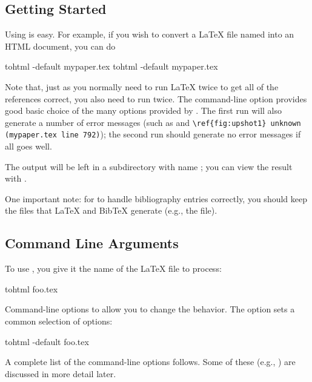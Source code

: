 \subsection{Getting Started}
Using  is easy.  For example, if you wish to convert a LaTeX file
named  into an HTML document, you can do
\begin{example}
tohtml -default mypaper.tex
tohtml -default mypaper.tex
\end{example}
Note that, just as you normally need to run LaTeX twice to get all of the
references correct, you also need to run  twice.  The
command-line option  provides good basic choice of the many
options provided by .  The first run will also generate a number
of error messages (such as  and 
\verb+\ref{fig:upshot1} unknown (mypaper.tex line 792)+); the second run
should generate no error messages if all goes well.

The output will be left in a subdirectory with name ; you can
view the result with .

One important note:  for  to handle bibliography entries
correctly, you should keep the files that LaTeX and BibTeX generate 
(e.g., the  file).  

\subsection{Command Line Arguments}
To use , you give it the name of the LaTeX
file to process:
\begin{example}
tohtml foo.tex
\end{example}
Command-line options to  allow you to change the behavior.  The
option  sets a common selection of options:
\begin{example}
tohtml -default foo.tex
\end{example}

A complete list of the command-line options follows.  Some of these (e.g.,
) are discussed in more detail later.

